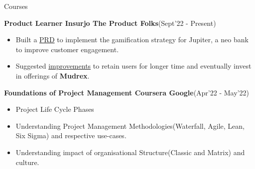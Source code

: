\documentclass{resume}
\newcommand{\sepval}{-0.5em}
\begin{document}

\begin{rSection}{Courses}
\vspace{-.4cm}
 
\item{\bf Product Learner Insurjo The Product Folks}\hfill{(Sept'22 - Present)}\\
[-0.4cm]

\begin{itemize}[leftmargin=*]

	\itemsep \sepval

	\item Built a \href{https://drive.google.com/file/d/1u6uiQsXEsm6QAMnPC-vQYK94N5bbqwSt/view?usp=share_link}{PRD} to implement the gamification strategy for Jupiter, a neo bank to improve customer engagement.

	\item Suggested \href{https://drive.google.com/file/d/1XgBXYlvwXj22Xdp10PC8FvQQhP0Q3tq4/view?usp=share_link}{improvements} to retain users for longer time and eventually invest in offerings of {\bf Mudrex}.


\end{itemize}

\vspace{-.2cm}
\item{\bf Foundations of Project Management Coursera Google}\hfill{(Apr'22 - May'22)}\\
[-0.4cm]

\begin{itemize}[leftmargin=*]

	\itemsep \sepval

	\item Project Life Cycle Phases
	
	\item Understanding Project Management Methodologies(Waterfall, Agile, Lean, Six Sigma) and respective use-cases.
	
	\item Understanding impact of organisational Structure(Classic and Matrix) and culture.

\end{itemize}


\end{rSection}
\end{document}
